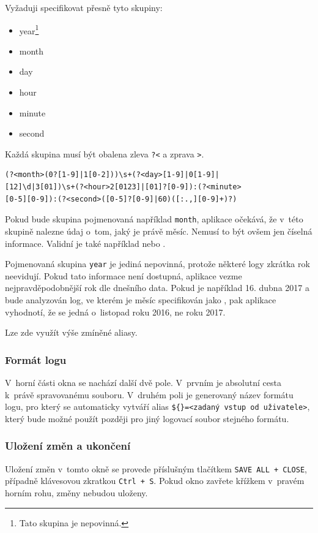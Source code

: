 \documentclass[thesis=B,czech]{FITthesis}[2012/06/26]
\begin{document}
Vyžaduji specifikovat přesně tyto skupiny:
\begin{itemize}
	\item year\footnote{Tato skupina je nepovinná.}
	\item month
	\item day
	\item hour
	\item minute
	\item second
\end{itemize}

Každá skupina musí být obalena zleva \texttt{?<} a zprava \texttt{>}.

\begin{lstlisting}[frame=single,caption=Příklad regulárního výrazu získávájící datum a čas z~události, label=regExpExample]
(?<month>(0?[1-9]|1[0-2]))\s+(?<day>[1-9]|0[1-9]|
[12]\d|3[01])\s+(?<hour>2[0123]|[01]?[0-9]):(?<minute>
[0-5][0-9]):(?<second>([0-5]?[0-9]|60)([:.,][0-9]+)?)
\end{lstlisting}

Pokud bude skupina pojmenovaná například \texttt{month}, aplikace očekává, že v~této skupině nalezne údaj o~tom, jaký je právě měsíc. Nemusí to být ovšem jen číselná informace. Validní je také například  nebo . 

Pojmenovaná skupina \texttt{year} je jediná nepovinná, protože některé logy zkrátka rok neevidují. Pokud tato informace není dostupná, aplikace vezme nejpravděpodobnější rok dle dnešního data. Pokud je například 16. dubna 2017 a bude analyzován log, ve kterém je měsíc specifikován jako , pak aplikace vyhodnotí, že se jedná o~listopad roku 2016, ne roku 2017.

Lze zde využít výše zmíněné aliasy.

\subsubsection{Formát logu}
V~horní části okna se nachází další dvě pole. V~prvním je absolutní cesta k~právě spravovanému souboru. V~druhém poli je generovaný název formátu logu, pro který se automaticky vytváří alias \texttt{\$\{<název formátu>\}=<zadaný vstup od uživatele>}, který bude možné použít později pro jiný logovací soubor stejného formátu.

\subsubsection{Uložení změn a ukončení}
Uložení změn v~tomto okně se provede příslušným tlačítkem \texttt{SAVE ALL + CLOSE}, případně klávesovou zkratkou \texttt{Ctrl + S}. Pokud okno zavřete křížkem v~pravém horním rohu, změny nebudou uloženy.
\end{document}
